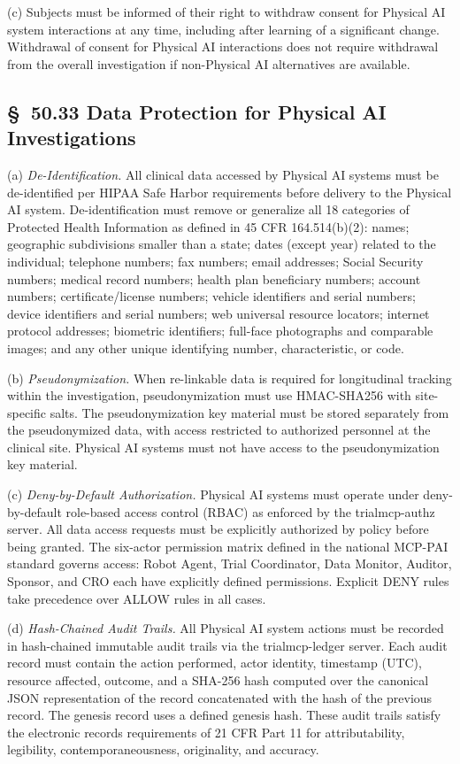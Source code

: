 \documentclass[11pt]{article}
\begin{document}
(c) Subjects must be informed of their right to withdraw consent for Physical AI system interactions at any time, including after learning of a significant change. Withdrawal of consent for Physical AI interactions does not require withdrawal from the overall investigation if non-Physical AI alternatives are available.

\subsection{\S~50.33 Data Protection for Physical AI Investigations}

(a) \textit{De-Identification.} All clinical data accessed by Physical AI systems must be de-identified per HIPAA Safe Harbor requirements before delivery to the Physical AI system. De-identification must remove or generalize all 18 categories of Protected Health Information as defined in 45 CFR 164.514(b)(2): names; geographic subdivisions smaller than a state; dates (except year) related to the individual; telephone numbers; fax numbers; email addresses; Social Security numbers; medical record numbers; health plan beneficiary numbers; account numbers; certificate/license numbers; vehicle identifiers and serial numbers; device identifiers and serial numbers; web universal resource locators; internet protocol addresses; biometric identifiers; full-face photographs and comparable images; and any other unique identifying number, characteristic, or code.

(b) \textit{Pseudonymization.} When re-linkable data is required for longitudinal tracking within the investigation, pseudonymization must use HMAC-SHA256 with site-specific salts. The pseudonymization key material must be stored separately from the pseudonymized data, with access restricted to authorized personnel at the clinical site. Physical AI systems must not have access to the pseudonymization key material.

(c) \textit{Deny-by-Default Authorization.} Physical AI systems must operate under deny-by-default role-based access control (RBAC) as enforced by the trialmcp-authz server. All data access requests must be explicitly authorized by policy before being granted. The six-actor permission matrix defined in the national MCP-PAI standard governs access: Robot Agent, Trial Coordinator, Data Monitor, Auditor, Sponsor, and CRO each have explicitly defined permissions. Explicit DENY rules take precedence over ALLOW rules in all cases.

(d) \textit{Hash-Chained Audit Trails.} All Physical AI system actions must be recorded in hash-chained immutable audit trails via the trialmcp-ledger server. Each audit record must contain the action performed, actor identity, timestamp (UTC), resource affected, outcome, and a SHA-256 hash computed over the canonical JSON representation of the record concatenated with the hash of the previous record. The genesis record uses a defined genesis hash. These audit trails satisfy the electronic records requirements of 21 CFR Part 11 for attributability, legibility, contemporaneousness, originality, and accuracy.
\end{document}

